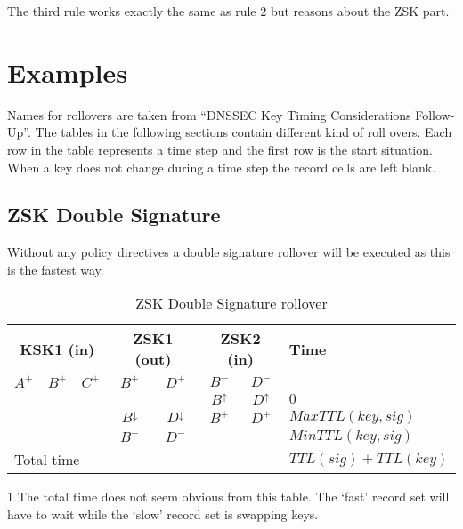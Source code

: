\documentclass[twoside, a4paper]{article}
\begin{document}
The third rule works exactly the same as rule 2 but reasons about 
the ZSK part. 

\section{Examples}

Names for rollovers are taken from ``DNSSEC Key Timing 
Considerations Follow-Up''. The tables in the following sections 
contain different kind of roll overs. Each row in the table 
represents a time step and the first row is the start situation. 
When a key does not change during a time step the record cells are 
left blank.

\subsection{ZSK Double Signature}

Without any policy directives a 
double signature rollover will be executed as this is the fastest way.

\begin{table}[h]
	\centering
	\begin{threeparttable} 
		
		\begin{tabular}{ |ccc|cc|cc|l| }
		\hline
		\multicolumn{3}{|c|}{KSK1 (in)} & \multicolumn{2}{c|}{ZSK1 (out)} & \multicolumn{2}{c|}{ZSK2 (in)} & Time\\
		\hline
		$A^{+}$ & $B^{+}$ & $C^{+}$ & $B^{+}$          & $D^{+}$          & $B^{-}$        & $D^{-}$        & \\
				&         &         &                  &                  & $B^{\uparrow}$ & $D^{\uparrow}$ & $0$\\
				&         &         & $B^{\downarrow}$ & $D^{\downarrow}$ & $B^{+}$        & $D^{+}$        & $MaxTTL(key, sig)$\\
				&         &         & $B^{-}$          & $D^{-}$          &                &                & $MinTTL(key, sig)$\\
		\hline
		\multicolumn{7}{|l|}{Total time} & $TTL(sig) + TTL(key)$\tnote{1}\\
		\hline
		\end{tabular}
		
		\begin{tablenotes}[para]
		\item[1] The total time does not seem obvious from this table.
			The `fast' record set will have to wait while the `slow'
			record set is swapping keys.
		\end{tablenotes}
		
	\end{threeparttable}
	\caption{ZSK Double Signature rollover}
	\label{tab:roll_dubsig}
\end{table}
\end{document}
